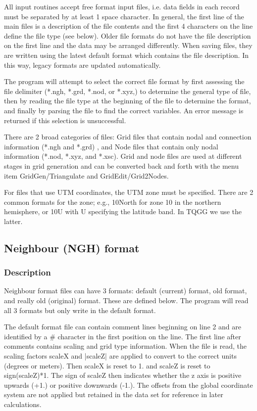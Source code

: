 \documentclass{article}
\begin{document}
All input routines accept free format input files, i.e. data fields in each record must be separated by at least 1 space character.
In general, the first line of the main files is a description of the file contents and the first 4 characters
on the line define the file type (see below). Older file formats do not have the file description on the first line and the data
may be arranged differently. When saving files, they are written using the latest default format which contains
the file description. In this way, legacy formats are updated automatically.

The program will attempt to select the correct file format by first assessing the file delimiter (*.ngh, *.grd, *.nod, or *.xyz,)
to determine the general type of file, then
by reading the file type at the beginning of the file to determine the format, and finally by parsing the file to find the correct variables. An error message is returned if this selection is unsuccessful.

There are 2 broad categories of files: Grid files that contain nodal and connection information (*.ngh and *.grd)
, and Node files that contain only nodal information (*.nod, *.xyz, and *.xsc). Grid and node files are used at different 
stages in grid generation and can be converted back and forth with the menu item GridGen/Triangulate and
GridEdit/Grid2Nodes.

For files that use UTM coordinates, the UTM zone must be specified. There are 2 common formats for the zone;
 e.g., 10North for zone 10 in the northern hemisphere, or 10U with U specifying the latitude band.  In TQGG we use the latter.

\newpage
\subsection[Neighbour (NGH) format]{Neighbour (NGH) format}

\subsubsection[Description]{Description}

Neighbour format files can have 3 formats: default (current) format, old format, and really old (original) format.
These are defined below. The program will read all 3 formats but only write in the default format.

The default format file can contain comment lines beginning on line 2 and are identified by a \# character in the
first position on the line. The first line after comments contains scaling and grid type information. When the file is read,
the scaling factors scaleX and |scaleZ| are applied to convert to the correct units (degrees or meters). Then scaleX
is reset to 1. and scaleZ is reset to sign(scaleZ)*1. The sign of scaleZ then indicates whether the z axis is positive
upwards (+1.) or positive downwards (-1.). The offsets from
the global coordinate system are not applied but retained in the data set for reference in later calculations.
\end{document}
